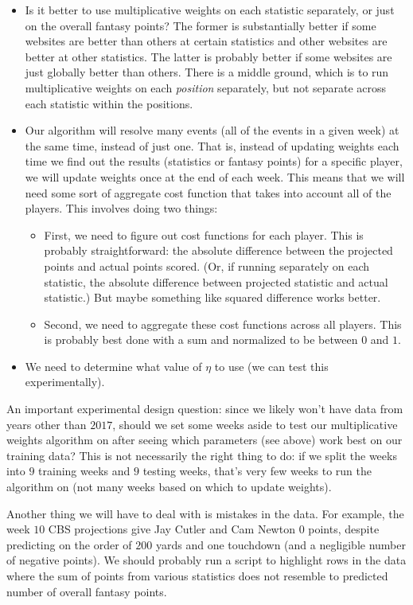 \documentclass{article}
\begin{document}
\begin{itemize}
    \item Is it better to use multiplicative weights on each statistic separately, or just on the overall fantasy points? The former is substantially better if some websites are better than others at certain statistics and other websites are better at other statistics. The latter is probably better if some websites are just globally better than others. There is a middle ground, which is to run multiplicative weights on each \emph{position} separately, but not separate across each statistic within the positions.
    \item Our algorithm will resolve many events (all of the events in a given week) at the same time, instead of just one. That is, instead of updating weights each time we find out the results (statistics or fantasy points) for a specific player, we will update weights once at the end of each week. This means that we will need some sort of aggregate cost function that takes into account all of the players. This involves doing two things:
    \begin{itemize}
        \item First, we need to figure out cost functions for each player. This is probably straightforward: the absolute difference between the projected points and actual points scored. (Or, if running separately on each statistic, the absolute difference between projected statistic and actual statistic.) But maybe something like squared difference works better.
        \item Second, we need to aggregate these cost functions across all players. This is probably best done with a sum and normalized to be between $0$ and $1$.
    \end{itemize}
    \item We need to determine what value of $\eta$ to use (we can test this experimentally).
\end{itemize}

An important experimental design question: since we likely won't have data from years other than $2017$, should we set some weeks aside to test our multiplicative weights algorithm on after seeing which parameters (see above) work best on our training data? This is not necessarily the right thing to do: if we split the weeks into $9$ training weeks and $9$ testing weeks, that's very few weeks to run the algorithm on (not many weeks based on which to update weights).

Another thing we will have to deal with is mistakes in the data. For example, the week $10$ CBS projections give Jay Cutler and Cam Newton $0$ points, despite predicting on the order of $200$ yards and one touchdown (and a negligible number of negative points). We should probably run a script to highlight rows in the data where the sum of points from various statistics does not resemble to predicted number of overall fantasy points.
\end{document}
